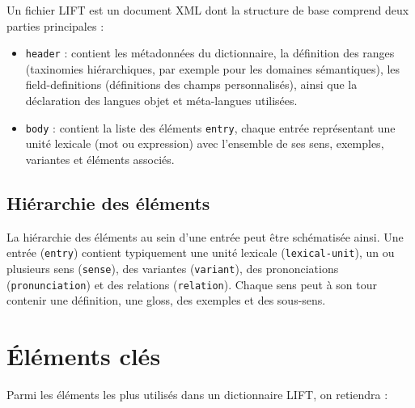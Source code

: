 \documentclass[11pt,twoside,openany]{book}
\begin{document}
Un fichier LIFT est un document XML dont la structure de base comprend deux parties principales :

\begin{itemize}
\item \texttt{header} : contient les métadonnées du dictionnaire, la définition des ranges (taxinomies hiérarchiques, par exemple pour les domaines sémantiques), les field-definitions (définitions des champs personnalisés), ainsi que la déclaration des langues objet et méta-langues utilisées.
\item \texttt{body} : contient la liste des éléments \texttt{entry}, chaque entrée représentant une unité lexicale (mot ou expression) avec l'ensemble de ses sens, exemples, variantes et éléments associés.
\end{itemize}

\subsection{Hiérarchie des éléments}

La hiérarchie des éléments au sein d'une entrée peut être schématisée ainsi. Une entrée (\texttt{entry}) contient typiquement une unité lexicale (\texttt{lexical-unit}), un ou plusieurs sens (\texttt{sense}), des variantes (\texttt{variant}), des prononciations (\texttt{pronunciation}) et des relations (\texttt{relation}). Chaque sens peut à son tour contenir une définition, une gloss, des exemples et des sous-sens.

\begin{center}
\end{center}

\section{Éléments clés}

Parmi les éléments les plus utilisés dans un dictionnaire LIFT, on retiendra :
\end{document}
